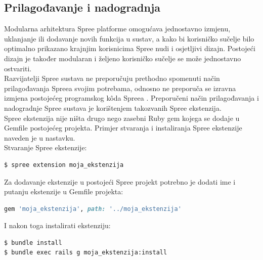
\subsection{Prilagođavanje i nadogradnja}

Modularna arhitektura Spree platforme omogućava jednostavno izmjenu, uklanjanje ili dodavanje novih funkcija u sustav, a kako bi korisničko sučelje bilo optimalno prikazano krajnjim korisnicima Spree nudi i osjetljivi dizajn. 
Postojeći dizajn je također modularan i željeno korisničko sučelje se može jednostavno ostvariti.
\\
Razvijatelji Spree sustava ne preporučuju prethodno spomenuti način prilagođavanja Spreea svojim potrebama, odnosno ne preporuča se izravna izmjena postojećeg programskog kôda Spreea \citep{spreeExt}. 
Preporučeni način prilagođavanja i nadogradnje Spree sustava je korištenjem takozvanih Spree ekstenzija.
\\
Spree ekstenzija nije ništa drugo nego zasebni Ruby gem kojega se dodaje u Gemfile postojećeg projekta. 
Primjer stvaranja i instaliranja Spree ekstenzije naveden je u nastavku.
\\

Stvaranje Spree ekstenzije:
\begin{lstlisting}[language=bash]
$ spree extension moja_ekstenzija
\end{lstlisting}

Za dodavanje ekstenzije u postojeći Spree projekt potrebno je dodati ime i putanju ekstenzije u Gemfile projekta:
\begin{lstlisting}[language=ruby]
gem 'moja_ekstenzija', path: '../moja_ekstenzija'
\end{lstlisting}

I nakon toga instalirati ekstenziju:
\begin{lstlisting}[language=bash]
$ bundle install
$ bundle exec rails g moja_ekstenzija:install
\end{lstlisting}

